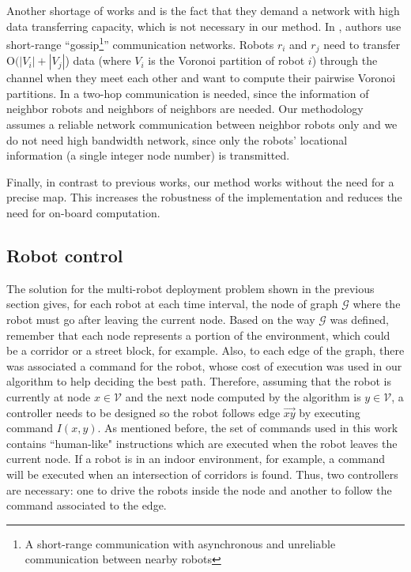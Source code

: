 \documentclass[smallcondensed]{svjour3}
\begin{document}
{%
Another shortage of works \citep{Durham2012} and \citep{Yun2013} is the fact that they demand a network with high data transferring capacity, which is not necessary in our method. 
%
In \cite{Durham2012}, authors use short-range ``gossip\footnote{A short-range communication with asynchronous and unreliable communication between nearby robots}'' communication networks. Robots $r_i$ and $r_j$ need to transfer O$(|V_i | + |V_j |$) data (where $V_i$ is the Voronoi partition of robot $i$) through the channel when they meet each other and want to compute their pairwise Voronoi partitions. In \cite{Yun2013} a two-hop communication is needed, since the information of neighbor robots and neighbors of neighbors are needed.
Our methodology assumes a reliable network communication between neighbor robots only and we do not need high bandwidth network, since only the robots' locational information (a single integer node number) is transmitted.

%
Finally, in contrast to previous works, our method works without the need for a precise map. This increases the robustness of the implementation and reduces the need for on-board computation. }
\subsection{Robot control}
\label{sec:robotcontrol}

The solution for the multi-robot deployment problem shown in the previous section gives, for each robot at each time interval, the node of graph $\mathcal{G}$ where the robot must go after leaving the current node. Based on the way $\mathcal{G}$ was defined, remember that each node represents a portion of the environment, which could be a corridor or a street block, for example. Also, to each edge of the graph, there was associated a command for the robot, whose cost of execution was used in our algorithm to help deciding the best path.  Therefore, assuming that the robot is currently at node $x\in\mathcal{V}$ and the next node computed by the algorithm is $y\in\mathcal{V}$, a controller needs to be designed so the robot follows edge $\overrightarrow{xy}$ by executing command $I(x,y)$. As mentioned before, the set of commands used in this work contains ``human-like" instructions which are executed when the robot leaves the current node. If a robot is in an indoor environment, for example, a command will be executed when an intersection of corridors is found. Thus, two controllers are necessary: one to drive the robots inside the node and another to follow the command associated to the edge. 
\end{document}
